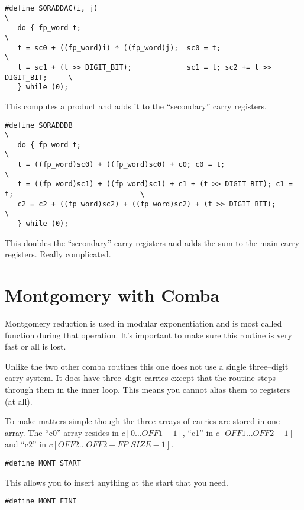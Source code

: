 \documentclass[b5paper]{book}
\begin{document}
\begin{verbatim}
#define SQRADDAC(i, j)                                                         \
   do { fp_word t;                                                             \
   t = sc0 + ((fp_word)i) * ((fp_word)j);  sc0 = t;                            \
   t = sc1 + (t >> DIGIT_BIT);             sc1 = t; sc2 += t >> DIGIT_BIT;     \
   } while (0);
\end{verbatim}
This computes a product and adds it to the ``secondary'' carry registers.

\begin{verbatim}
#define SQRADDDB                                                               \
   do { fp_word t;                                                             \
   t = ((fp_word)sc0) + ((fp_word)sc0) + c0; c0 = t;                                                 \
   t = ((fp_word)sc1) + ((fp_word)sc1) + c1 + (t >> DIGIT_BIT); c1 = t;                              \
   c2 = c2 + ((fp_word)sc2) + ((fp_word)sc2) + (t >> DIGIT_BIT);                                     \
   } while (0);
\end{verbatim}
This doubles the ``secondary'' carry registers and adds the sum to the main carry registers.  Really complicated.

\section{Montgomery with Comba}
Montgomery reduction is used in modular exponentiation and is most called function during
that operation.  It's important to make sure this routine is very fast or all is lost.

Unlike the two other comba routines this one does not use a single three--digit carry 
system.  It does have three--digit carries except that the routine steps through them
in the inner loop.  This means you cannot alias them to registers (at all).

To make matters simple though the three arrays of carries are stored in one array.  The 
``c0'' array resides in $c[0 \ldots OFF1-1]$, ``c1'' in $c[OFF1 \ldots OFF2-1]$ and ``c2'' in
$c[OFF2 \ldots OFF2+FP\_SIZE-1]$.  

\begin{verbatim}
#define MONT_START 
\end{verbatim}

This allows you to insert anything at the start that you need.

\begin{verbatim}
#define MONT_FINI
\end{verbatim}
\end{document}
